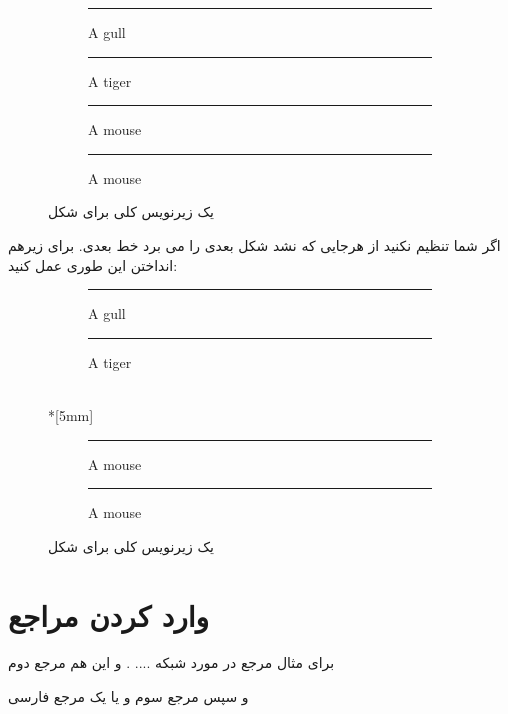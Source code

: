 \documentclass{report}
\begin{document}
\begin{figure}[ht]
\centering
\begin{subfigure}[b]{0.3\textwidth}\centering
\rule{2cm}{2cm}
\caption{A gull}
\label{fig:gull}
\end{subfigure}
\begin{subfigure}[b]{0.3\textwidth}\centering
\rule{2cm}{2cm}
\caption{A tiger}
\label{fig:tiger}
\end{subfigure}
\begin{subfigure}[b]{0.3\textwidth}\centering
\rule{2cm}{2cm}
\caption{A mouse}
\label{fig:mouse}
\end{subfigure}
\begin{subfigure}[b]{0.3\textwidth}\centering
\rule{2cm}{2cm}
\caption{A mouse}
\label{fig:mouse}
\end{subfigure}
\caption{یک زیرنویس کلی برای شکل}
\label{fig:animals}
\end{figure}
اگر شما تنظیم نکنید از هرجایی که نشد شکل بعدی را می برد خط بعدی.  برای زیرهم انداختن این طوری عمل کنید:
\begin{figure}[ht]
\centering
\begin{subfigure}[b]{0.3\textwidth}\centering
\rule{2cm}{2cm}
\caption{A gull}
\label{fig:gull}
\end{subfigure}
\begin{subfigure}[b]{0.3\textwidth}\centering
\rule{2cm}{2cm}
\caption{A tiger}
\label{fig:tiger}
\end{subfigure}\\*[5mm]
\begin{subfigure}[b]{0.3\textwidth}\centering
\rule{2cm}{2cm}
\caption{A mouse}
\label{fig:mouse}
\end{subfigure}
\begin{subfigure}[b]{0.3\textwidth}\centering
\rule{2cm}{2cm}
\caption{A mouse}
\label{fig:mouse}
\end{subfigure}
\caption{یک زیرنویس کلی برای شکل}
\label{fig:dddd}
\end{figure}

\chapter{وارد کردن مراجع}
برای مثال مرجع {\cite{Beasley}} در مورد شبکه .... . و این هم مرجع دوم {\cite{Meyer2004}} 

و سپس مرجع سوم {\cite{Rafsanjani2010}} و یا یک مرجع فارسی
\cite{Unknown1389}
\end{document}
